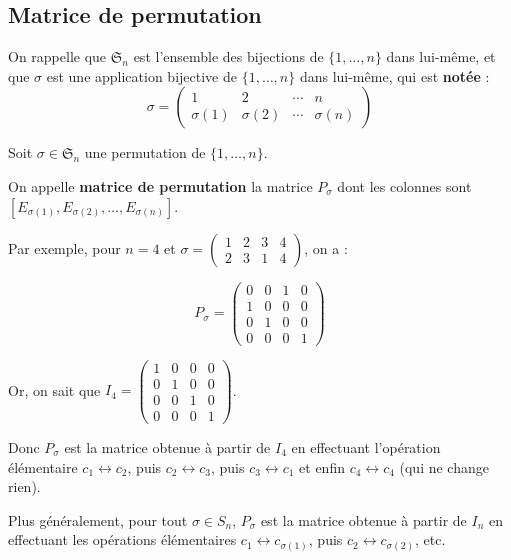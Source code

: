 \documentclass[12pt, a4paper]{report}
\begin{document}
\subsection{Matrice de permutation}

On rappelle que $\mathfrak{S}_n$ est l'ensemble des bijections de $\{1,\dots,n\}$ dans lui-même, et que $\sigma$ est une application bijective de $\{1,\dots,n\}$ dans lui-même, qui est \textbf{notée} :
$$\sigma = \left(\begin{matrix} 1 & 2 & \cdots & n \\ \sigma(1) & \sigma(2) & \cdots & \sigma(n) \end{matrix}\right)$$

\begin{definition}
    Soit $\sigma \in \mathfrak{S}_n$ une permutation de $\{1,\dots,n\}$.
    
    On appelle \textbf{matrice de permutation} la matrice $P_\sigma$ dont les colonnes sont $[E_{\sigma(1)}, E_{\sigma(2)}, \dots, E_{\sigma(n)}]$.

    Par exemple, pour $n=4$ et $\sigma = \left(\begin{matrix} 1 & 2 & 3 & 4 \\ 2 & 3 & 1 & 4 \end{matrix}\right)$, on a :

    $$P_\sigma = \left(\begin{matrix}
        0 & 0 & 1 & 0 \\
        1 & 0 & 0 & 0 \\
        0 & 1 & 0 & 0 \\
        0 & 0 & 0 & 1
    \end{matrix}\right)$$

    Or, on sait que $I_4 = \left(\begin{matrix}
        1 & 0 & 0 & 0 \\
        0 & 1 & 0 & 0 \\
        0 & 0 & 1 & 0 \\
        0 & 0 & 0 & 1 \end{matrix}\right)$.

    Donc $P_\sigma$ est la matrice obtenue à partir de $I_4$ en effectuant l'opération élémentaire $c_1 \leftrightarrow c_2$, puis $c_2 \leftrightarrow c_3$, puis $c_3 \leftrightarrow c_1$ et enfin $c_4 \leftrightarrow c_4$ (qui ne change rien).

    Plus généralement, pour tout $\sigma \in S_n$, $P_\sigma$ est la matrice obtenue à partir de $I_n$ en effectuant les opérations élémentaires $c_1 \leftrightarrow c_{\sigma(1)}$, puis $c_2 \leftrightarrow c_{\sigma(2)}$, etc.
\end{definition}
\end{document}
